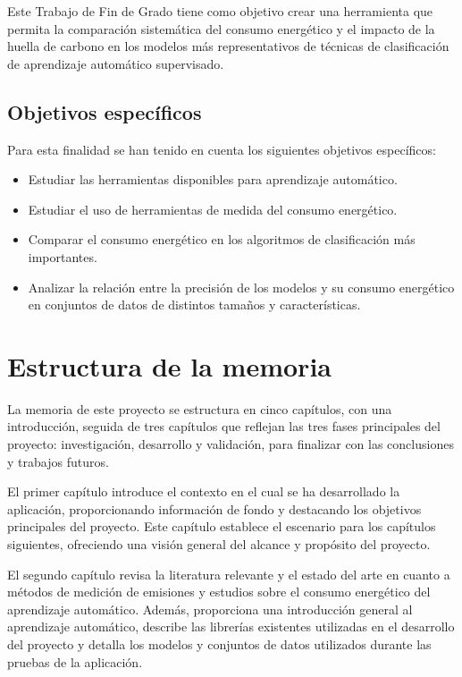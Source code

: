 Este Trabajo de Fin de Grado tiene como objetivo crear una herramienta que permita la comparación sistemática del consumo energético y el impacto de la huella de carbono en los modelos más representativos de técnicas de clasificación de aprendizaje automático supervisado.


\subsection{Objetivos específicos}
\label{sec:objetivos-especificos}

Para esta finalidad se han tenido en cuenta los siguientes objetivos específicos:

    \begin{itemize}
        \item Estudiar las herramientas disponibles para aprendizaje automático.
        \item Estudiar el uso de herramientas de medida del consumo energético.
        \item Comparar el consumo energético en los algoritmos de clasificación más importantes.
        \item Analizar la relación entre la precisión de los modelos y su consumo energético en conjuntos de datos de distintos tamaños y características.
    \end{itemize}

\section{Estructura de la memoria}
\label{sec:estructura}

La memoria de este proyecto se estructura en cinco capítulos, con una introducción, seguida de tres capítulos que reflejan las tres fases principales del proyecto: investigación, desarrollo y validación, para finalizar con las conclusiones y trabajos futuros.

El primer capítulo introduce el contexto en el cual se ha desarrollado la aplicación, proporcionando información de fondo y destacando los objetivos principales del proyecto. Este capítulo establece el escenario para los capítulos siguientes, ofreciendo una visión general del alcance y propósito del proyecto.

El segundo capítulo revisa la literatura relevante y el estado del arte en cuanto a métodos de medición de emisiones y estudios sobre el consumo energético del aprendizaje automático. Además, proporciona una introducción general al aprendizaje automático, describe las librerías existentes utilizadas en el desarrollo del proyecto y detalla los modelos y conjuntos de datos utilizados durante las pruebas de la aplicación.

